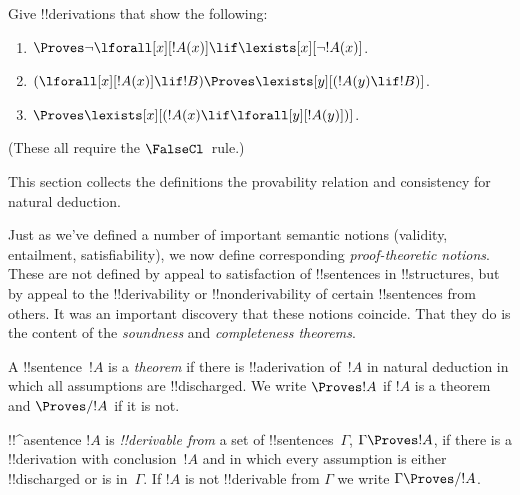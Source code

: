 \begin{prob}
Give !!{derivation}s that show the following:
\begin{enumerate}
\item $\Proves \lnot\lforall[x][!A(x)] \lif \lexists[x][\lnot!A(x)]$.
\item $(\lforall[x][!A(x)] \lif !B) \Proves \lexists[y][(!A(y) \lif !B)]$.
\item $\Proves \lexists[x][(!A(x) \lif \lforall[y][!A(y)])]$.
\end{enumerate}
(These all require the $\FalseCl$~rule.)
\end{prob}








\begin{editorial}
This section collects the definitions the provability relation
and consistency for natural deduction.
\end{editorial}

\begin{explain}
Just as we've defined a number of important semantic notions
(validity, entailment, satisfiability), we now define corresponding
\emph{proof-theoretic notions}.  These are not defined by appeal to
satisfaction of !!{sentence}s in !!{structure}s, but by appeal to the
!!{derivability} or !!{nonderivability} of certain !!{sentence}s from
others.  It was an important discovery that these notions coincide.
That they do is the content of the \emph{soundness} and
\emph{completeness theorems}.
\end{explain}


\begin{defn}[Theorems]
A !!{sentence}~$!A$ is a \emph{theorem} if there is !!a{derivation}
of~$!A$ in natural deduction in which all assumptions are
!!{discharged}.  We write $\Proves !A$ if $!A$ is a theorem and
$\Proves/ !A$ if it is not.
\end{defn}

\begin{defn}[!!^{derivability}]
!!^a{sentence} $!A$ is \emph{!!{derivable} from} a set of
!!{sentence}s~$\Gamma$, $\Gamma \Proves !A$, if there is a
!!{derivation} with conclusion~$!A$ and in which every assumption
is either !!{discharged} or is in~$\Gamma$. If $!A$ is not
!!{derivable} from $\Gamma$ we write $\Gamma \Proves/ !A$.
\end{defn}

